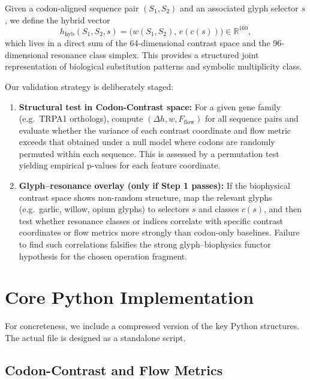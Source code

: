 \documentclass[11pt]{article}
\begin{document}
Given a codon-aligned sequence pair $(S_1,S_2)$ and an associated glyph selector $s$, we define the hybrid vector
\begin{equation}
 h_{\text{hyb}}(S_1,S_2,s) = \bigl(w(S_1,S_2),\, e(c(s))\bigr) \in \mathbb{R}^{160},
\end{equation}
which lives in a direct sum of the 64-dimensional contrast space and the 96-dimensional resonance class simplex. This provides a structured joint representation of biological substitution patterns and symbolic multiplicity class.

Our validation strategy is deliberately staged:
\begin{enumerate}
  \item \textbf{Structural test in Codon-Contrast space:} For a given gene family (e.g.\ TRPA1 orthologs), compute $(\Delta h, w, F_{\text{flow}})$ for all sequence pairs and evaluate whether the variance of each contrast coordinate and flow metric exceeds that obtained under a null model where codons are randomly permuted within each sequence. This is assessed by a permutation test yielding empirical p-values for each feature coordinate.\cite{codoncontrast}
  \item \textbf{Glyph--resonance overlay (only if Step 1 passes):} If the biophysical contrast space shows non-random structure, map the relevant glyphs (e.g.\ garlic, willow, opium glyphs) to selectors $s$ and classes $c(s)$, and then test whether resonance classes or indices correlate with specific contrast coordinates or flow metrics more strongly than codon-only baselines. Failure to find such correlations falsifies the strong glyph--biophysics functor hypothesis for the chosen operation fragment.
\end{enumerate}

\section{Core Python Implementation}

For concreteness, we include a compressed version of the key Python structures. The actual file is designed as a standalone script.

\subsection{Codon-Contrast and Flow Metrics}
\end{document}
